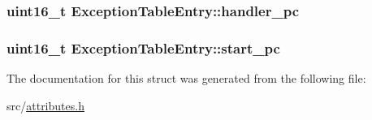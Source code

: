 \subsubsection[{\texorpdfstring{handler\+\_\+pc}{handler_pc}}]{\setlength{\rightskip}{0pt plus 5cm}uint16\+\_\+t Exception\+Table\+Entry\+::handler\+\_\+pc}\hypertarget{structExceptionTableEntry_a3fd0ed5cca1781e941594ef0af475add}{}\label{structExceptionTableEntry_a3fd0ed5cca1781e941594ef0af475add}
\subsubsection[{\texorpdfstring{start\+\_\+pc}{start_pc}}]{\setlength{\rightskip}{0pt plus 5cm}uint16\+\_\+t Exception\+Table\+Entry\+::start\+\_\+pc}\hypertarget{structExceptionTableEntry_a2b590ee5474b087686f851f10e3f8f06}{}\label{structExceptionTableEntry_a2b590ee5474b087686f851f10e3f8f06}


The documentation for this struct was generated from the following file\+:\begin{DoxyCompactItemize}
\item 
src/\hyperlink{attributes_8h}{attributes.\+h}\end{DoxyCompactItemize}
